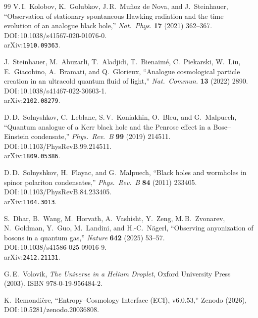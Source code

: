 \documentclass[12pt]{article}
\begin{document}
\begin{thebibliography}{99}
V.\,I.\ Kolobov, K.\ Golubkov, J.\,R.\ Mu\~noz de Nova, and J.\ Steinhauer,
``Observation of stationary spontaneous Hawking radiation and the time
evolution of an analogue black hole,''
\textit{Nat.\ Phys.} \textbf{17} (2021) 362--367.\\
DOI:\,10.1038/s41567-020-01076-0.\\
arXiv:\texttt{1910.09363}.

J.\ Steinhauer, M.\ Abuzarli, T.\ Aladjidi, T.\ Bienaim\'e,
C.\ Piekarski, W.\ Liu, E.\ Giacobino, A.\ Bramati, and Q.\ Glorieux,
``Analogue cosmological particle creation in an ultracold quantum fluid
of light,''
\textit{Nat.\ Commun.} \textbf{13} (2022) 2890.\\
DOI:\,10.1038/s41467-022-30603-1.\\
arXiv:\texttt{2102.08279}.

D.\,D.\ Solnyshkov, C.\ Leblanc, S.\,V.\ Koniakhin, O.\ Bleu,
and G.\ Malpuech,
``Quantum analogue of a Kerr black hole and the Penrose effect
in a Bose--Einstein condensate,''
\textit{Phys.\ Rev.\ B} \textbf{99} (2019) 214511.\\
DOI:\,10.1103/PhysRevB.99.214511.\\
arXiv:\texttt{1809.05386}.

D.\,D.\ Solnyshkov, H.\ Flayac, and G.\ Malpuech,
``Black holes and wormholes in spinor polariton condensates,''
\textit{Phys.\ Rev.\ B} \textbf{84} (2011) 233405.\\
DOI:\,10.1103/PhysRevB.84.233405.\\
arXiv:\texttt{1104.3013}.

S.\ Dhar, B.\ Wang, M.\ Horvath, A.\ Vashisht, Y.\ Zeng, M.\,B.\ Zvonarev,
N.\ Goldman, Y.\ Guo, M.\ Landini, and H.-C.\ N\"agerl,
``Observing anyonization of bosons in a quantum gas,''
\textit{Nature} \textbf{642} (2025) 53--57.\\
DOI:\,10.1038/s41586-025-09016-9.\\
arXiv:\texttt{2412.21131}.

G.\,E.\ Volovik,
\textit{The Universe in a Helium Droplet},
Oxford University Press (2003). ISBN 978-0-19-956484-2.

K.\ Remondi\`ere,
``Entropy--Cosmology Interface (ECI), v6.0.53,''
Zenodo (2026), DOI:\,10.5281/zenodo.20036808.

\end{thebibliography}
\end{document}
